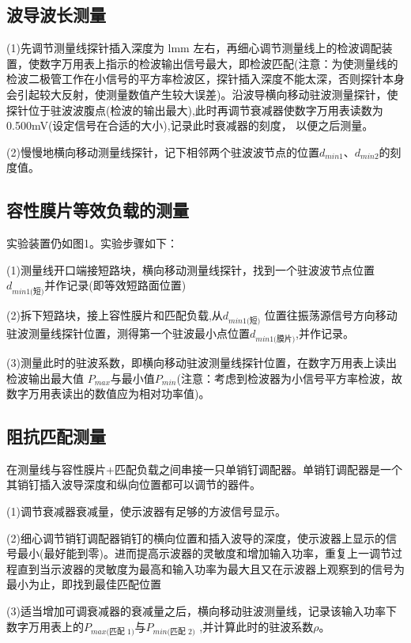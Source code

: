\documentclass[12pt,a4paper,UTF8]{article}
\begin{document}
\subsection{波导波长测量}

(1)先调节测量线探针插入深度为 lmm 左右，再细心调节测量线上的检波调配装置，使数字万用表上指示的检波输出信号最大，即检波匹配(注意：为使测量线的检波二极管工作在小信号的平方率检波区，探针插入深度不能太深，否则探针本身会引起较大反射，使测量数值产生较大误差)。沿波导横向移动驻波测量探针，使探针位于驻波波腹点(检波的输出最大),此时再调节衰减器使数字万用表读数为0.500mV(设定信号在合适的大小),记录此时衰减器的刻度， 以便之后测量。

(2)慢慢地横向移动测量线探针，记下相邻两个驻波波节点的位置$d_{min1}$、$d_{min2}$的刻度值。

\subsection{容性膜片等效负载的测量}

实验装置仍如图1。实验步骤如下：

(1)测量线开口端接短路块，横向移动测量线探针，找到一个驻波波节点位置$d_{min1\text{(短)}}$并作记录(即等效短路面位置)

(2)拆下短路块，接上容性膜片和匹配负载,从$d_{min1\text{(短)}}$ 位置往振荡源信号方向移动驻波测量线探针位置，测得第一个驻波最小点位置$d_{min1\text{(膜片)}}$,并作记录。

(3)测量此时的驻波系数，即横向移动驻波测量线探针位置，在数字万用表上读出检波输出最大值 $P_{max}$与最小值$P_{min}$(注意：考虑到检波器为小信号平方率检波，故数字万用表读出的数值应为相对功率值)。

\subsection{阻抗匹配测量}
在测量线与容性膜片+匹配负载之间串接一只单销钉调配器。单销钉调配器是一个其销钉插入波导深度和纵向位置都可以调节的器件。

(1)调节衰减器衰减量，使示波器有足够的方波信号显示。

(2)细心调节销钉调配器销钉的横向位置和插入波导的深度，使示波器上显示的信号最小(最好能到零)。进而提高示波器的灵敏度和增加输入功率，重复上一调节过程直到当示波器的灵敏度为最高和输入功率为最大且又在示波器上观察到的信号为最小为止，即找到最佳匹配位置

(3)适当增加可调衰减器的衰减量之后，横向移动驻波测量线，记录该输入功率下数字万用表上的$P_{max\text{(匹配 1)}}$与$P_{min\text{(匹配 2)}}$ ,并计算此时的驻波系数$\rho$。
\end{document}
